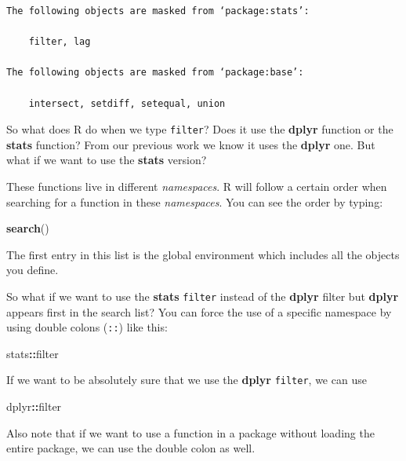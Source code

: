 \documentclass[
]{krantz}
\newenvironment{Shaded}{\begin{snugshade}}{\end{snugshade}}
\newcommand{\KeywordTok}[1]{\textcolor[rgb]{0.27,0.27,0.27}{\textbf{#1}}}
\newcommand{\NormalTok}[1]{#1}
\newcommand{\OperatorTok}[1]{\textcolor[rgb]{0.43,0.43,0.43}{\textbf{#1}}}
\begin{document}
\begin{verbatim}
The following objects are masked from ‘package:stats’:

    filter, lag

The following objects are masked from ‘package:base’:

    intersect, setdiff, setequal, union
\end{verbatim}

So what does R do when we type \texttt{filter}? Does it use the \textbf{dplyr} function or the \textbf{stats} function? From our previous work we know it uses the \textbf{dplyr} one. But what if we want to use the \textbf{stats} version?

These functions live in different \emph{namespaces}. R will follow a certain order when searching for a function in these \emph{namespaces}. You can see the order by typing:

\begin{Shaded}
\begin{Highlighting}[]
\KeywordTok{search}\NormalTok{()}
\end{Highlighting}
\end{Shaded}

The first entry in this list is the global environment which includes all the objects you define.

So what if we want to use the \textbf{stats} \texttt{filter} instead of the \textbf{dplyr} filter but \textbf{dplyr} appears first in the search list? You can force the use of a specific namespace by using double colons (\texttt{::}) like this:

\begin{Shaded}
\begin{Highlighting}[]
\NormalTok{stats}\OperatorTok{::}\NormalTok{filter}
\end{Highlighting}
\end{Shaded}

If we want to be absolutely sure that we use the \textbf{dplyr} \texttt{filter}, we can use

\begin{Shaded}
\begin{Highlighting}[]
\NormalTok{dplyr}\OperatorTok{::}\NormalTok{filter}
\end{Highlighting}
\end{Shaded}

Also note that if we want to use a function in a package without loading the entire package, we can use the double colon as well.
\end{document}
